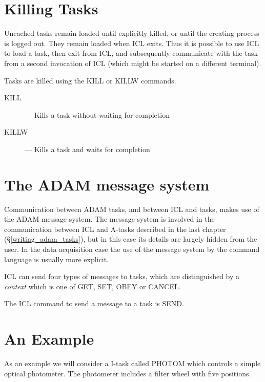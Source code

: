 \documentclass[twoside,11pt,nolof,chapters]{starlink}
\begin{document}
\section{Killing Tasks}

Uncached tasks remain loaded until explicitly killed, or until the creating
process is logged out. They remain loaded when ICL exits. Thus it is possible
to use ICL to load a task, then exit from ICL, and subsequently communicate
with the task from a second invocation of ICL (which might be started on
a different terminal).

Tasks are killed using the KILL or KILLW commands.

\begin{description}

\item[KILL] --- Kills a task without waiting for completion

\item[KILLW] --- Kills a task and waits for completion

\end{description}

\section{The ADAM message system}

Communication between ADAM tasks, and between ICL and tasks, makes use of
the ADAM message system. The message system is involved in the communication
between ICL and A-tasks described in the last chapter (\S\ref{writing_adam_tasks}), but in this case
its details are largely hidden from the user. In the data acquisition case
the use of the message system by the command language is usually more explicit.

ICL can send four types of messages to tasks, which are distinguished by
a \emph{context} which is one of GET, SET, OBEY or CANCEL.

The ICL command to send a message to a task is SEND.

\section{An Example}

As an example we will consider a I-task called PHOTOM which controls a simple
optical photometer. The photometer includes a filter wheel with five positions.
\end{document}
